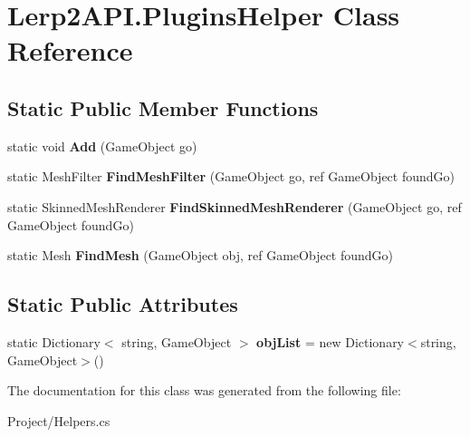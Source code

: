 \hypertarget{class_lerp2_a_p_i_1_1_plugins_helper}{}\section{Lerp2\+A\+P\+I.\+Plugins\+Helper Class Reference}
\label{class_lerp2_a_p_i_1_1_plugins_helper}
\subsection*{Static Public Member Functions}
\begin{DoxyCompactItemize}
\item 
\mbox{\label{class_lerp2_a_p_i_1_1_plugins_helper_a06fb453a33da624a854b7765baa9f5b7}} 
static void {\bfseries Add} (Game\+Object go)
\item 
\mbox{\label{class_lerp2_a_p_i_1_1_plugins_helper_a72d09eb55062a21bf9b7aab9aeda26d1}} 
static Mesh\+Filter {\bfseries Find\+Mesh\+Filter} (Game\+Object go, ref Game\+Object found\+Go)
\item 
\mbox{\label{class_lerp2_a_p_i_1_1_plugins_helper_abe1c340adaf2dde99c9c606ca03bfd9f}} 
static Skinned\+Mesh\+Renderer {\bfseries Find\+Skinned\+Mesh\+Renderer} (Game\+Object go, ref Game\+Object found\+Go)
\item 
\mbox{\label{class_lerp2_a_p_i_1_1_plugins_helper_adba5193168949358019cf34ffaf94569}} 
static Mesh {\bfseries Find\+Mesh} (Game\+Object obj, ref Game\+Object found\+Go)
\end{DoxyCompactItemize}
\subsection*{Static Public Attributes}
\begin{DoxyCompactItemize}
\item 
\mbox{\label{class_lerp2_a_p_i_1_1_plugins_helper_a2ebf213ad9056fd29d3fae221340e22c}} 
static Dictionary$<$ string, Game\+Object $>$ {\bfseries obj\+List} = new Dictionary$<$string, Game\+Object$>$()
\end{DoxyCompactItemize}


The documentation for this class was generated from the following file\+:\begin{DoxyCompactItemize}
\item 
Project/Helpers.\+cs\end{DoxyCompactItemize}
